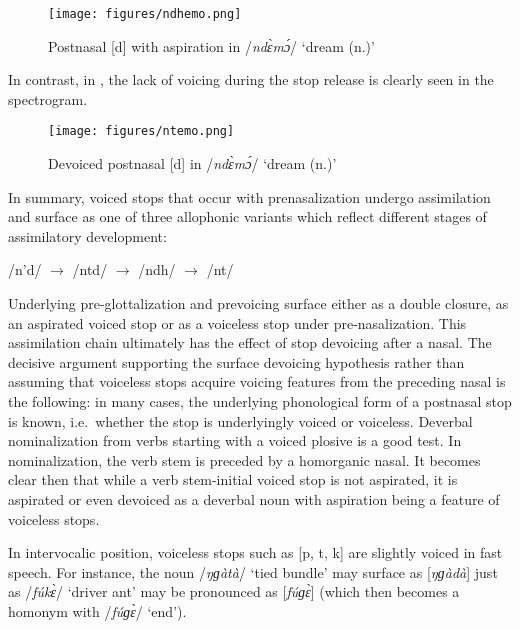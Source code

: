\begin{figure}
\texttt{[image: figures/ndhemo.png]}
\caption{Postnasal [d] with aspiration in /{\itshape ndɛ̀mɔ́}/ `dream (n.)'}
\label{Fig:ndhemo}
\end{figure}

\noindent In contrast, in , the lack of voicing during the stop release is clearly seen in the spectrogram.

\begin{figure}
\texttt{[image: figures/ntemo.png]}
\caption{Devoiced postnasal [d] in /{\itshape ndɛ̀mɔ́}/ `dream (n.)'}
\label{Fig:ntemo}
\end{figure}

In summary, voiced stops that occur with prenasalization undergo assimilation and surface as one of three allophonic variants which reflect different stages of assimilatory development:
\begin{center}
/n'd/ $\rightarrow$ /ntd/ $\rightarrow$ /ndh/ $\rightarrow$ /nt/
\end{center}

Underlying pre-glottalization and prevoicing surface either as a double closure, as an aspirated voiced stop or as a voiceless stop under pre-nasalization. This assimilation chain ultimately has the effect of stop devoicing after a nasal.
The decisive argument supporting the surface devoicing hypothesis rather than assuming that voiceless stops acquire voicing features from the preceding nasal is the following: in many cases, the underlying phonological form of a postnasal stop is known, i.e.\ whether the stop is underlyingly voiced or voiceless. Deverbal nominalization from verbs starting with a voiced plosive is a good test. In nominalization, the verb stem is preceded by a homorganic nasal. It becomes clear then that while a verb stem-initial voiced stop is not aspirated, it is aspirated or even devoiced as a deverbal noun with aspiration being a feature of voiceless stops.



\fi





In intervocalic position, voiceless stops such as [p, t, k] are slightly voiced in fast speech. For instance, the noun /{\itshape ŋɡàtà}/ `tied bundle' may surface as [{\itshape ŋɡàdà}] just as /{\itshape fúkɛ̀}/ `driver ant' may be pronounced as [{\itshape fúɡɛ̀}] (which then becomes a homonym with /{\itshape fúɡɛ̀}/ `end'). 


